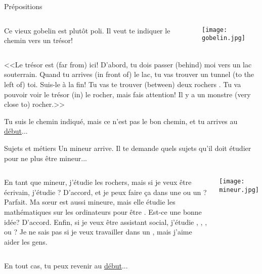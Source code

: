 \documentclass{beamer}
\begin{document}
  \begin{frame}{Prépositions}
    \hypertarget{prépositions}{}
    \begin{columns}
        Ce vieux gobelin est plutôt poli.
        Il veut te indiquer le chemin vers un trésor!
        \begin{center}
          \texttt{[image: gobelin.jpg]}
        \end{center}
    \end{columns}

    \vspace{0.25cm}
    <<Le trésor est \underline{} (far from) ici!
    D'abord, tu dois passer \underline{} (behind) moi vers un lac souterrain.
    Quand tu arrives \underline{} (in front of) le lac, tu vas trouver un tunnel \underline{} (to the left of) toi.
    Suis-le à la fin!
    Tu vas te trouver \underline{} (between) deux rochers .
    Tu va pouvoir voir le trésor \underline{} (in) le rocher, mais fais attention!
    Il y a un monstre \underline{} (very close to) rocher.>>

    \vspace{0.25cm}
    Tu suis le chemin indiqué, mais ce n'est pas le bon chemin, et tu arrives au \hyperlink{début}{début}...
  \end{frame}

  \begin{frame}{Sujets et métiers}
    \hypertarget{sujets}{}
    Un mineur arrive.
    Il te demande quels sujets qu'il doit étudier pour ne plus être mineur...

    \vspace{0.25cm}
    \begin{columns}
        \small
        En tant que mineur, j'étudie les rochers, mais si je veux être écrivain, j'étudie \underline{}?
        D'accord, et je peux faire ça dans une \underline{} ou un \underline{}?
        Parfait.
        Ma sœur est aussi mineure, mais elle étudie les mathématiques sur les ordinateurs pour être \underline{}.
        Est-ce une bonne idée?
        D'accord.
        Enfin, si je veux être assistant social, j'étudie \underline{}, \underline{}, \underline{}, ou \underline{}?
        Je ne sais pas si je veux travailler dans un \underline{}, mais j'aime aider les gens.

        \begin{center}
          \texttt{[image: mineur.jpg]}
        \end{center}
    \end{columns}
    \vspace{0.25cm}
    En tout cas, tu peux revenir au \hyperlink{début}{début}...
  \end{frame}
\end{document}
